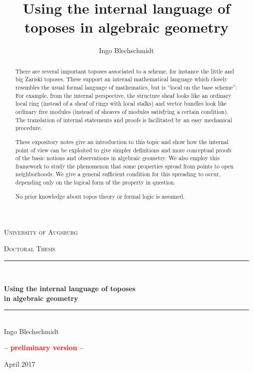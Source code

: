 \documentclass[10pt,reqno,a4paper]{amsbook}
\title{Using the internal language of toposes in algebraic geometry}
\author{Ingo Blechschmidt}
\theoremstyle{definition}
\theoremstyle{plain}
\theoremstyle{remark}
\newcommand{\?}{\,{:}\,}
\renewcommand{\_}{\mathpunct{.}\,}
\begin{document}
\begin{abstract}
  There are several important toposes associated to a scheme, for instance the
  little and big Zariski toposes. These support an internal mathematical language
  which closely resembles the usual formal language of mathematics, but is ``local
  on the base scheme'':
  For example, from the internal perspective, the structure sheaf looks like an
  ordinary local ring (instead of a sheaf of rings with local stalks) and vector
  bundles look like ordinary free modules (instead of sheaves of modules
  satisfying a certain condition). The translation of internal statements and
  proofs is facilitated by an easy mechanical procedure.

  These expository notes give an introduction to this topic and show how the internal
  point of view can be exploited to give simpler definitions and more conceptual
  proofs of the basic notions and observations in algebraic geometry.
  We also employ this framework to study the phenomenon that some properties
  spread from points to open neighborhoods. We give a general sufficient
  condition for this spreading to occur, depending only on the logical
  form of the property in question.

  No prior knowledge about topos theory or formal logic is assumed.
\end{abstract}

\newcommand{\HRule}{\rule{\linewidth}{.6pt}}

\begin{center}
\thispagestyle{empty}

\vspace*{.06\textheight}
{\scshape\LARGE University of Augsburg\par}\vspace{1.5cm}
\textsc{\Large Doctoral Thesis}\\[0.5cm]

\HRule \\[0.4cm]
{\huge \bfseries Using the internal language of toposes \\ in algebraic geometry\par}\vspace{0.4cm} %
\HRule \\[0.5cm]

{\large Ingo Blechschmidt}

\vfill

\vspace{4cm}

\textbf{\textcolor{red}{-- preliminary version --}}

\vfill

{\large April 2017}\\[4cm] %

\vfill
\end{center}
\end{document}
